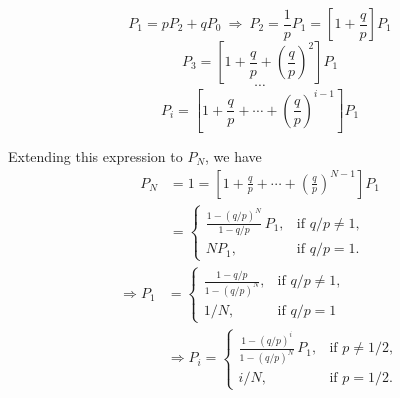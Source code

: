 
\[
P_1=pP_2+qP_0\ \Rightarrow\ P_2=\frac{1}{p}P_1=\left[1+\frac{q}{p}\right]P_1
\]
\[
P_3=\left[1+\frac{q}{p}+\left(\frac{q}{p}\right)^2\right]P_1
\]
\[
\cdots
\]
\[
P_i=\left[1+\frac{q}{p}+\cdots+\left(\frac{q}{p}\right)^{i-1}\right]P_1
\]

Extending this expression to \(P_N\), we have
\[
\begin{aligned}
P_N&=1=\left[1+\frac{q}{p}+\cdots+\left(\frac{q}{p}\right)^{N-1}\right]P_1\\
&=\begin{cases}
\displaystyle\frac{1-(q/p)^N}{1-q/p}\,P_1,&\text{if }q/p\ne1,\\[6pt]
NP_1,&\text{if }q/p=1.
\end{cases}
\end{aligned}
\]
\[
\begin{aligned}
\Rightarrow P_1&=\begin{cases}
\displaystyle\frac{1-q/p}{1-(q/p)^N},&\text{if }q/p\ne1,\\[6pt]
1/N,&\text{if }q/p=1
\end{cases}\\
&\Rightarrow P_i=\begin{cases}
\displaystyle\frac{1-(q/p)^i}{1-(q/p)^N}\,P_1,&\text{if }p\ne1/2,\\[6pt]
i/N,&\text{if }p=1/2.
\end{cases}
\end{aligned}
\]

